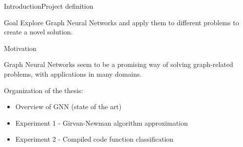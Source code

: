\documentclass[xcolor=table]{beamer}
\begin{document}



\begin{frame}{Introduction}{Project definition}
    \begin{block}{Goal}
    {
    Explore Graph Neural Networks and apply them to different problems to create a novel solution. \\

    }
    \end{block}

    \begin{block}{Motivation}
    {
    Graph Neural Networks seem to be a promising way of solving graph-related problems, with applications in many domains. 









    }
    \end{block}

    Organization of the thesis:
        \begin{itemize}
            \item Overview of GNN (state of the art)
            \item Experiment 1 - Girvan-Newman algorithm approximation
            \item Experiment 2 - Compiled code function classification
        \end{itemize}


\end{frame}
\end{document}
